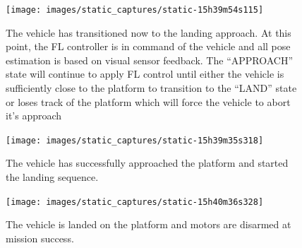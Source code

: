\begin{figure}
    \centering
    \texttt{[image: images/static\_captures/static-15h39m54s115]}
    \caption{The vehicle has transitioned now to the landing approach. At this point, the FL controller is in
    command of the vehicle and all pose estimation is based on visual sensor feedback. The ``APPROACH'' state
will continue to apply FL control until either the vehicle is sufficiently close to the platform to transition
to the ``LAND'' state or loses track of the platform which will force the vehicle to abort it's
approach}\label{f:smach_approach}
\end{figure}

\begin{figure}
    \centering
    \texttt{[image: images/static\_captures/static-15h39m35s318]}
    \caption{The vehicle has successfully approached the platform and started the landing
    sequence.}\label{f:smach_land}
\end{figure}

\begin{figure}
    \centering
    \texttt{[image: images/static\_captures/static-15h40m36s328]}
    \caption{The vehicle is landed on the platform and motors are disarmed at mission
    success.}\label{f:smach_complete}
\end{figure}

